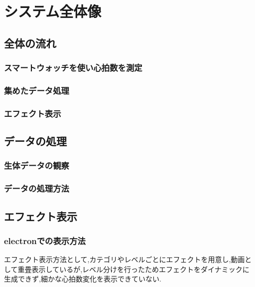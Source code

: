 \chapter{システム全体像}
\thispagestyle{myheadings}

\section{全体の流れ}

\subsection{スマートウォッチを使い心拍数を測定}

\subsection{集めたデータ処理}

\subsection{エフェクト表示}

\section{データの処理}

\subsection{生体データの観察}

\subsection{データの処理方法}

\section{エフェクト表示}



\subsection{electronでの表示方法}


エフェクト表示方法として,カテゴリやレベルごとにエフェクトを用意し,動画として重畳表示しているが,レベル分けを行ったためエフェクトをダイナミックに生成できず,細かな心拍数変化を表示できていない.


